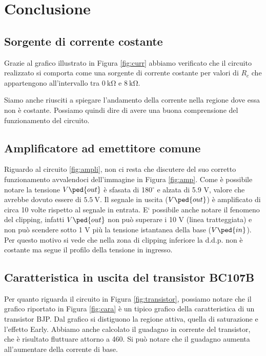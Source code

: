 \section*{Conclusione}

\subsection*{Sorgente di corrente costante}

Grazie al grafico illustrato in Figura \ref{fig:curr} abbiamo verificato che il circuito realizzato si comporta come una sorgente di corrente costante per valori di $R_c$ che appartengono all'intervallo tra $\SI{0}{\kilo\ohm}$ e $\SI{8}{\kilo\ohm}$.

Siamo anche riusciti a spiegare l'andamento della corrente nella regione dove essa non è costante. Possiamo
quindi dire di avere una buona comprensione del funzionamento del circuito.

\subsection*{Amplificatore ad emettitore comune}

Riguardo al circuito \ref{fig:ampli}, non ci resta che discutere del suo corretto funzionamento avvalendoci dell'immagine in Figura \ref{fig:amp}. Come è possibile notare la tensione $V\ped{out}$ è sfasata di 180$^\circ$ e alzata di 5.9 V, valore che avrebbe dovuto essere di $\SI{5.5}{\volt}$.
Il segnale in uscita ($V\ped{out}$) è amplificato di circa 10 volte rispetto al segnale in entrata.
E` possibile anche notare il fenomeno del clipping, infatti $V\ped{out}$ non può superare i 10 V (linea tratteggiata) e non può scendere sotto 1 V più la tensione istantanea della base ($V\ped{in}$). Per questo motivo si vede che nella zona di clipping inferiore la d.d.p. non è costante ma segue il profilo della tensione in ingresso.

\subsection*{Caratteristica in uscita del transistor BC107B}

Per quanto riguarda il circuito in Figura \ref{fig:transistor}, possiamo notare che il grafico riportato in Figura \ref{fig:cara} è un tipico grafico della caratteristica di un transistor BJP. 
Dal grafico si distiguono la regione attiva, quella di saturazione e l'effetto Early. Abbiamo anche calcolato il
guadagno in corrente del transistor, che è risultato fluttuare attorno a 460. Si può notare che il guadagno
aumenta all'aumentare della corrente di base.
